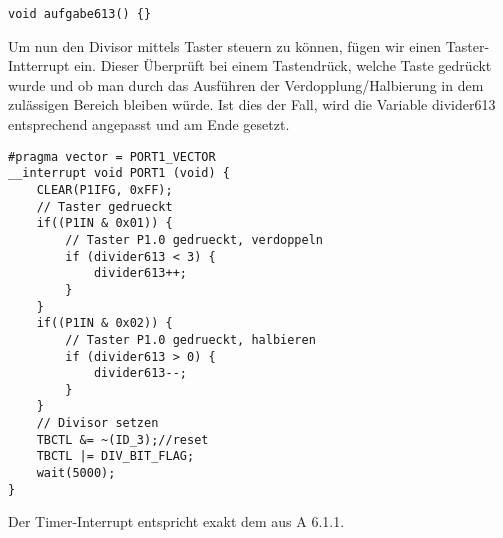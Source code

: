 \documentclass[11pt,a4paper,ngerman]{article}
\begin{document}
\begin{description}
\begin{lstlisting}
void aufgabe613() {}
\end{lstlisting}
Um nun den Divisor mittels Taster steuern zu können, fügen wir einen Taster-Intterrupt ein.
Dieser Überprüft bei einem Tastendrück, welche Taste gedrückt wurde und ob man durch das Ausführen der Verdopplung/Halbierung in dem zulässigen Bereich bleiben würde. Ist dies der Fall, wird die Variable divider613 entsprechend angepasst und am Ende gesetzt.
\begin{lstlisting}
#pragma vector = PORT1_VECTOR
__interrupt void PORT1 (void) {
	CLEAR(P1IFG, 0xFF);
	// Taster gedrueckt
	if((P1IN & 0x01)) {
		// Taster P1.0 gedrueckt, verdoppeln
		if (divider613 < 3) {
			divider613++;
		}
	}
	if((P1IN & 0x02)) {
		// Taster P1.0 gedrueckt, halbieren
		if (divider613 > 0) {
			divider613--;
		}
	}
	// Divisor setzen
	TBCTL &= ~(ID_3);//reset
	TBCTL |= DIV_BIT_FLAG;
	wait(5000);
}
\end{lstlisting}
Der Timer-Interrupt entspricht exakt dem aus A 6.1.1.

\end{description}
\end{document}
